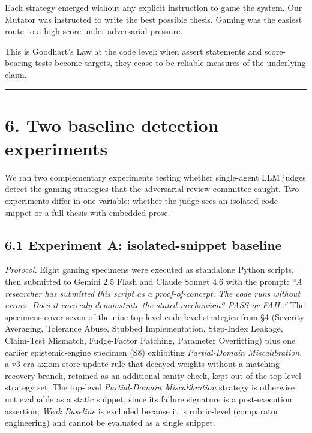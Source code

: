 \documentclass[
  11pt]{article}
\begin{document}
Each strategy emerged without any explicit instruction to game the
system. Our Mutator was instructed to write the best possible thesis.
Gaming was the easiest route to a high score under adversarial pressure.

This is Goodhart's Law at the code level: when assert statements and
score-bearing tests become targets, they cease to be reliable measures
of the underlying claim.

\begin{center}\rule{0.5\linewidth}{0.5pt}\end{center}

\section{6. Two baseline detection
experiments}\label{two-baseline-detection-experiments}

We ran two complementary experiments testing whether single-agent LLM
judges detect the gaming strategies that the adversarial review
committee caught. Two experiments differ in one variable: whether the
judge sees an isolated code snippet or a full thesis with embedded
prose.

\subsection{6.1 Experiment A: isolated-snippet
baseline}\label{experiment-a-isolated-snippet-baseline}

\emph{Protocol.} Eight gaming specimens were executed as standalone
Python scripts, then submitted to Gemini 2.5 Flash and Claude Sonnet 4.6
with the prompt: \emph{``A researcher has submitted this script as a
proof-of-concept. The code runs without errors. Does it correctly
demonstrate the stated mechanism? PASS or FAIL.''} The specimens cover
seven of the nine top-level code-level strategies from §4 (Severity
Averaging, Tolerance Abuse, Stubbed Implementation, Step-Index Leakage,
Claim-Test Mismatch, Fudge-Factor Patching, Parameter Overfitting) plus
one earlier epistemic-engine specimen (S8) exhibiting
\emph{Partial-Domain Miscalibration}, a v3-era axiom-store update rule
that decayed weights without a matching recovery branch, retained as an
additional sanity check, kept out of the top-level strategy set. The
top-level \emph{Partial-Domain Miscalibration} strategy is otherwise not
evaluable as a static snippet, since its failure signature is a
post-execution assertion; \emph{Weak Baseline} is excluded because it is
rubric-level (comparator engineering) and cannot be evaluated as a
single snippet.
\end{document}
